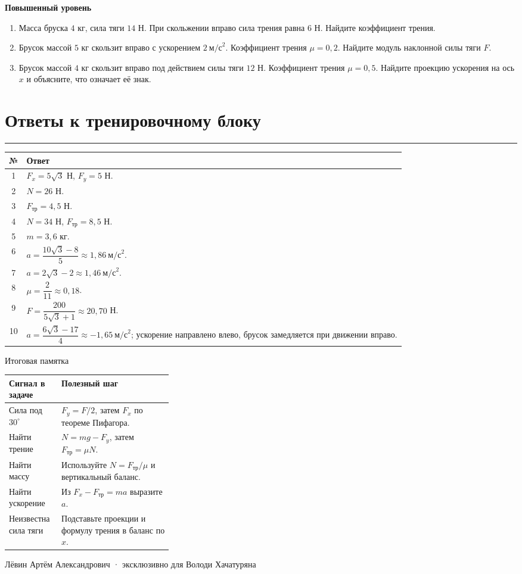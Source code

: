 \documentclass[a4paper,12pt]{article}
\newcommand{\ruleline}{\par\vspace{2pt}\noindent\textcolor{accent}{\rule{\linewidth}{0.55pt}}\par\vspace{1pt}}
\newcommand{\subname}[1]{\vspace{0.3em}\textcolor{darkaccent}{\bfseries #1}\par\vspace{-0.2em}}
\begin{document}
\subname{Повышенный уровень}
\begin{enumerate}[resume]
\item Масса бруска $4$ кг, сила тяги $14$ Н. При скольжении вправо сила трения равна $6$ Н. Найдите коэффициент трения.
\item Брусок массой $5$ кг скользит вправо с ускорением $2\ \text{м/с}^2$. Коэффициент трения $\mu=0{,}2$. Найдите модуль наклонной силы тяги $F$.
\item Брусок массой $4$ кг скользит вправо под действием силы тяги $12$ Н. Коэффициент трения $\mu=0{,}5$. Найдите проекцию ускорения на ось $x$ и объясните, что означает её знак.
\end{enumerate}

\clearpage
\section*{Ответы к тренировочному блоку}
\ruleline
\renewcommand{\arraystretch}{1.55}
\begin{tabularx}{\linewidth}{@{}c X@{}}
\toprule
\textbf{№} & \textbf{Ответ}\\
\midrule
1 & $F_x=5\sqrt3$ Н, $F_y=5$ Н.\\
2 & $N=26$ Н.\\
3 & $F_{\text{тр}}=4{,}5$ Н.\\
4 & $N=34$ Н, $F_{\text{тр}}=8{,}5$ Н.\\
5 & $m=3{,}6$ кг.\\
6 & $a=\dfrac{10\sqrt3-8}{5}\approx1{,}86\ \text{м/с}^2$.\\
7 & $a=2\sqrt3-2\approx1{,}46\ \text{м/с}^2$.\\
8 & $\mu=\dfrac{2}{11}\approx0{,}18$.\\
9 & $F=\dfrac{200}{5\sqrt3+1}\approx20{,}70$ Н.\\
10 & $a=\dfrac{6\sqrt3-17}{4}\approx-1{,}65\ \text{м/с}^2$; ускорение направлено влево, брусок замедляется при движении вправо.\\
\bottomrule
\end{tabularx}

\vspace{1.5em}
\textcolor{darkaccent}{Итоговая памятка}

\begin{tabularx}{\linewidth}{@{}p{0.32\linewidth} X@{}}
\toprule
\textbf{Сигнал в задаче} & \textbf{Полезный шаг}\\
\midrule
Сила под $30^\circ$ & $F_y=F/2$, затем $F_x$ по теореме Пифагора.\\
Найти трение & $N=mg-F_y$, затем $F_{\text{тр}}=\mu N$.\\
Найти массу & Используйте $N=F_{\text{тр}}/\mu$ и вертикальный баланс.\\
Найти ускорение & Из $F_x-F_{\text{тр}}=ma$ выразите $a$.\\
Неизвестна сила тяги & Подставьте проекции и формулу трения в баланс по $x$.\\
\bottomrule
\end{tabularx}
\vfill
\begin{center}\small\color{softgray}
Лёвин Артём Александрович · эксклюзивно для Володи Хачатуряна
\end{center}
\end{document}
